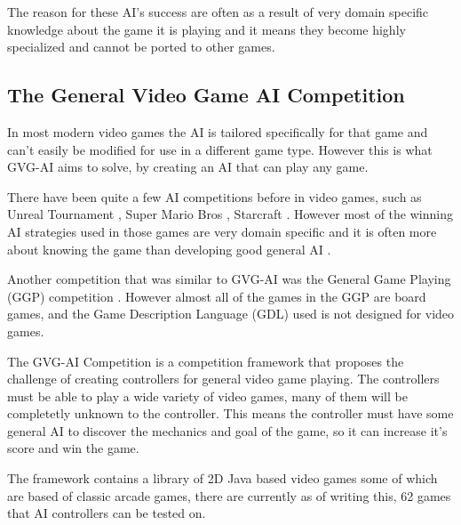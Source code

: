\documentclass[journal]{IEEEtran}
\begin{document}
		The reason for these AI's success are often as a result of very domain specific knowledge about the game it is playing and it means they become highly specialized and cannot be ported to other games.
		

	\subsection{The General Video Game AI Competition}
	
		In most modern video games the AI is tailored specifically for that game and can't easily be modified for use in a different game type. However this is what GVG-AI aims to solve, by creating an AI that can play any game. 
		
		There have been quite a few AI competitions before in video games, such as Unreal Tournament \cite{hingston2010new}, Super Mario Bros \cite{citationNeeded}, Starcraft \cite{ontanon2013survey}. 
		However most of the winning AI strategies used in those games are very domain specific and it is often more about knowing the game than developing good general AI \cite{perez20162014}. 
		 \par
		
		
		Another competition that was similar to GVG-AI was the General Game Playing (GGP) competition \cite{GGP2005general}. However almost all of the games in the GGP are board games, and the Game Description Language (GDL) used is not designed for video games.
		
		The GVG-AI Competition is a competition framework that proposes the challenge of creating controllers for general video game playing. The controllers must be able to play a wide variety of video games, many of them will be completetly unknown to the controller. This means the controller must have some general AI to discover the mechanics and goal of the game, so it can increase it's score and win the game. \cite{GVGAI, perez20162014}
		
		The framework contains a library of 2D Java based video games some of which are based of classic arcade games, there are currently as of writing this, 62 games that AI controllers can be tested on.
\end{document}
